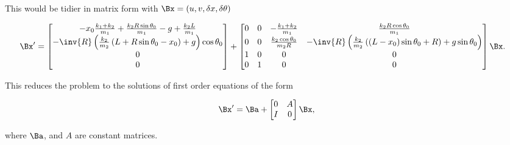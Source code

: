 This would be tidier in matrix form with $\Bx = (u, v, \delta x, \delta \theta)$

\begin{align}
\label{eqn:hoopSpring:6}
\Bx' &=
\begin{bmatrix}
-x_0 \frac{k_1 + k_2}{m_1} 
+ \frac{k_2 R \sin\theta_0}{m_1} 
- g + \frac{k_2 L }{m_1} \\
- \inv{R}\left( \frac{k_2}{m_2} \left( L + R \sin\theta_0 - x_0 \right) +g \right) \cos\theta_0 \\
0 \\
0
\end{bmatrix}
+
\begin{bmatrix}
0 & 0 &
-\frac{k_1 + k_2}{m_1} & \frac{k_2 R \cos\theta_0}{m_1} \\
0 & 0 & 
\frac{k_2 \cos\theta_0}{m_2 R} &
- \inv{R}\left( \frac{k_2}{m_2} \left( \left( L - x_0 \right) \sin\theta_0 + R \right) + g \sin\theta_0 \right) \\
1 & 0 & 0 & 0 \\
0 & 1 & 0 & 0 \\
\end{bmatrix}\Bx
.
\end{align}

This reduces the problem to the solutions of first order equations of the form

\begin{align}\label{eqn:hoopSpring:7}
\Bx' = \Ba 
+ \begin{bmatrix}
0 & A \\
I & 0
\end{bmatrix}\Bx,
\end{align}

where $\Ba$, and $A$ are constant matrices.

\EndNoBibArticle
